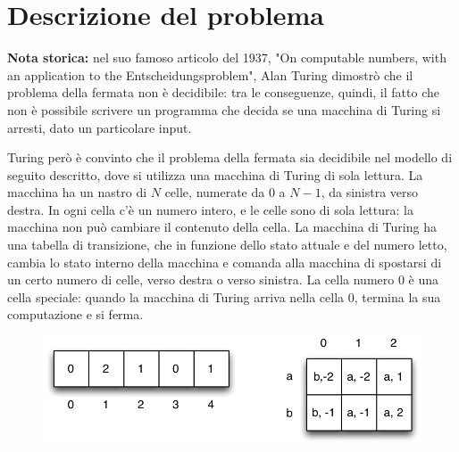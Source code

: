 \documentclass[a4paper,11pt]{article}
\begin{document}
\vspace{0.5cm}



\section*{Descrizione del problema}
  
\textbf{Nota storica:} nel suo famoso articolo del 1937, "On computable
numbers, with an application to the Entscheidungsproblem", Alan Turing
dimostrò che il problema della fermata non è decidibile: tra le
conseguenze, quindi, il fatto che non è possibile scrivere un programma
che decida se una macchina di Turing si arresti, dato un particolare
input.
    
Turing però è convinto che il problema della fermata sia decidibile nel
modello di seguito descritto, dove si utilizza una macchina di Turing di
sola lettura. La macchina ha un nastro di $N$ celle, numerate da $0$ a
$N-1$, da sinistra verso destra. In ogni cella c'è un numero intero, e
le celle sono di sola lettura: la macchina non può cambiare il contenuto
della cella. La macchina di Turing ha una tabella di transizione, che in
funzione dello stato attuale e del numero letto, cambia lo stato interno
della macchina e comanda alla macchina di spostarsi di un certo numero
di celle, verso destra o verso sinistra. La cella numero 0 è una cella
speciale: quando la macchina di Turing arriva nella cella 0, termina la
sua computazione e si ferma.

\begin{figure}[h!]
  \centering
  \caption{}
  \includegraphics{figura.png}
\end{figure}
\end{document}
